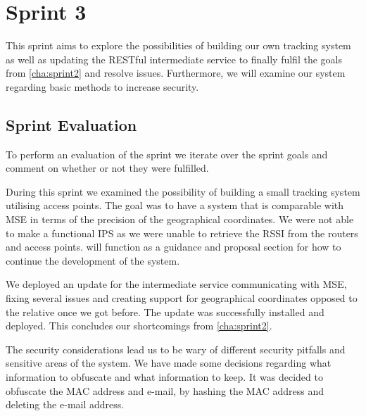 \chapter{Sprint 3}\label{cha:sprint3}
This sprint aims to explore the possibilities of building our own tracking system as well as updating the RESTful intermediate service to finally fulfil the goals from \cref{cha:sprint2} and resolve issues. Furthermore, we will examine our system regarding basic methods to increase security.





\section{Sprint Evaluation}
To perform an evaluation of the sprint we iterate over the sprint goals and comment on whether or not they were fulfilled.

During this sprint we examined the possibility of building a small tracking system utilising access points. The goal was to have a system that is comparable with MSE in terms of the precision of the geographical coordinates. We were not able to make a functional IPS as we were unable to retrieve the RSSI from the routers and access points.  will function as a guidance and proposal section for how to continue the development of the system.

We deployed an update for the intermediate service communicating with MSE, fixing several issues and creating support for geographical coordinates opposed to the relative once we got before. The update was successfully installed and deployed. This concludes our shortcomings from \cref{cha:sprint2}.

The security considerations lead us to be wary of different security pitfalls and sensitive areas of the system. We have made some decisions regarding what information to obfuscate and what information to keep. It was decided to obfuscate the MAC address and e-mail, by hashing the MAC address and deleting the e-mail address.